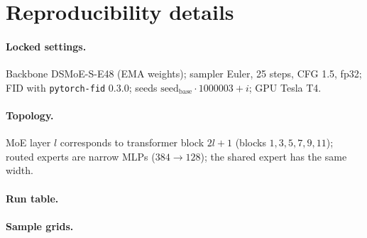 \section{Reproducibility details}\label{app:repro}
\paragraph{Locked settings.} Backbone DSMoE-S-E48 (EMA weights); sampler Euler, 25 steps, CFG 1.5, fp32; FID with \texttt{pytorch-fid} 0.3.0; seeds $\text{seed}_{\text{base}}\cdot1000003+i$; GPU Tesla T4. 
\paragraph{Topology.} MoE layer $l$ corresponds to transformer block $2l+1$ (blocks $1,3,5,7,9,11$); routed experts are narrow MLPs ($384\to128$); the shared expert has the same width.
\paragraph{Run table.} 
\paragraph{Sample grids.} 
